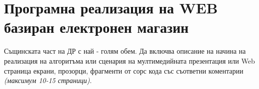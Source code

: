 \chapter{Програмна реализация на WEB базиран електронен магазин}

Същинската част на ДР с най - голям обем. Да включва описание на начина на реализация на алгоритъма или сценария на мултимедийната презентация или Web страница екрани, прозорци, фрагменти от сорс кода със съответни коментарии \emph{(максимум 10-15 страници)}.
